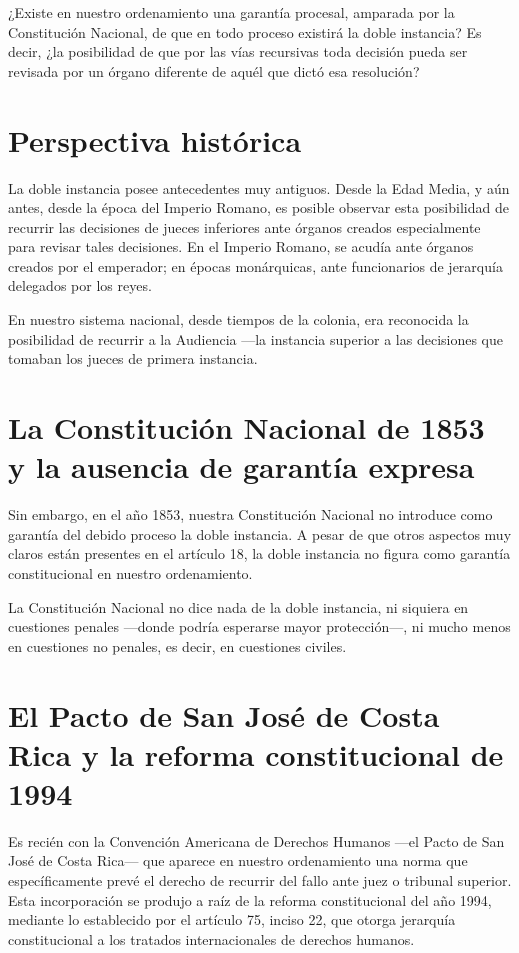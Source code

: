 \documentclass[12pt,oneside]{book}
\begin{document}
¿Existe en nuestro ordenamiento una garantía procesal, amparada por la Constitución Nacional, de que en todo proceso existirá la doble instancia? Es decir, ¿la posibilidad de que por las vías recursivas toda decisión pueda ser revisada por un órgano diferente de aquél que dictó esa resolución?

\section{Perspectiva histórica}

La doble instancia posee antecedentes muy antiguos. Desde la Edad Media, y aún antes, desde la época del Imperio Romano, es posible observar esta posibilidad de recurrir las decisiones de jueces inferiores ante órganos creados especialmente para revisar tales decisiones. En el Imperio Romano, se acudía ante órganos creados por el emperador; en épocas monárquicas, ante funcionarios de jerarquía delegados por los reyes.

En nuestro sistema nacional, desde tiempos de la colonia, era reconocida la posibilidad de recurrir a la Audiencia ---la instancia superior a las decisiones que tomaban los jueces de primera instancia.

\section{La Constitución Nacional de 1853 y la ausencia de garantía expresa}

Sin embargo, en el año 1853, nuestra Constitución Nacional no introduce como garantía del debido proceso la doble instancia. A pesar de que otros aspectos muy claros están presentes en el artículo 18, la doble instancia no figura como garantía constitucional en nuestro ordenamiento.

\begin{important}
La Constitución Nacional no dice nada de la doble instancia, ni siquiera en cuestiones penales ---donde podría esperarse mayor protección---, ni mucho menos en cuestiones no penales, es decir, en cuestiones civiles.
\end{important}

\section{El Pacto de San José de Costa Rica y la reforma constitucional de 1994}

Es recién con la Convención Americana de Derechos Humanos ---el Pacto de San José de Costa Rica--- que aparece en nuestro ordenamiento una norma que específicamente prevé el derecho de recurrir del fallo ante juez o tribunal superior. Esta incorporación se produjo a raíz de la reforma constitucional del año 1994, mediante lo establecido por el artículo 75, inciso 22, que otorga jerarquía constitucional a los tratados internacionales de derechos humanos.
\end{document}
